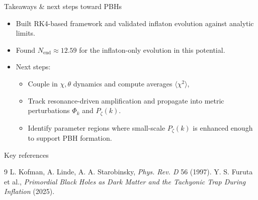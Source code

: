 \documentclass[aspectratio=169]{beamer}
\begin{document}
\begin{frame}{Takeaways \& next steps toward PBHs}
\begin{itemize}
  \item Built RK4-based framework and validated inflaton evolution against analytic limits.
  \item Found $N_{\mathrm{end}}\approx 12.59$ for the inflaton-only evolution in this potential.
  \item Next steps:
    \begin{itemize}
      \item Couple in $\chi,\theta$ dynamics and compute averages $\langle\chi^2\rangle$,
      \item Track resonance-driven amplification and propagate into metric perturbations $\Phi_k$ and $P_\zeta(k)$.
      \item Identify parameter regions where small-scale $P_\zeta(k)$ is enhanced enough to support PBH formation.
    \end{itemize}
\end{itemize}
\end{frame}

\begin{frame}{Key references}
\small
\begin{thebibliography}{9}
 L. Kofman, A. Linde, A. A. Starobinsky, \emph{Phys. Rev. D} 56 (1997).
 Y. S. Furuta et al., \emph{Primordial Black Holes as Dark Matter and the Tachyonic Trap During Inflation} (2025).
\end{thebibliography}
\end{frame}
\end{document}
